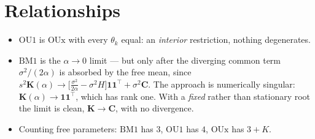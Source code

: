 \documentclass[11pt]{article}
\newcommand{\Cm}{\mathbf{C}}
\newcommand{\Km}{\mathbf{K}}
\newcommand{\one}{\mathbf{1}}
\begin{document}
\section*{Relationships}

\begin{itemize}[leftmargin=1.3em]
\item $\mathrm{OU1}$ is $\mathrm{OUx}$ with every $\theta_k$ equal: an \emph{interior} restriction, nothing
  degenerates.
\item $\mathrm{BM1}$ is the $\alpha \to 0$ limit --- but only after the diverging common term
  $\sigma^{2}/(2\alpha)$ is absorbed by the free mean, since
  $s^{2}\Km(\alpha) \to \bigl[\tfrac{\sigma^{2}}{2\alpha} - \sigma^{2}H\bigr]\one\one^{\!\top}
  + \sigma^{2}\Cm$. The approach is numerically singular: $\Km(\alpha) \to \one\one^{\!\top}$, which
  has rank one. With a \emph{fixed} rather than stationary root the limit is clean,
  $\Km \to \Cm$, with no divergence.
\item Counting free parameters: $\mathrm{BM1}$ has $3$, $\mathrm{OU1}$ has $4$, $\mathrm{OUx}$ has
  $3 + K$.
\end{itemize}
\end{document}
